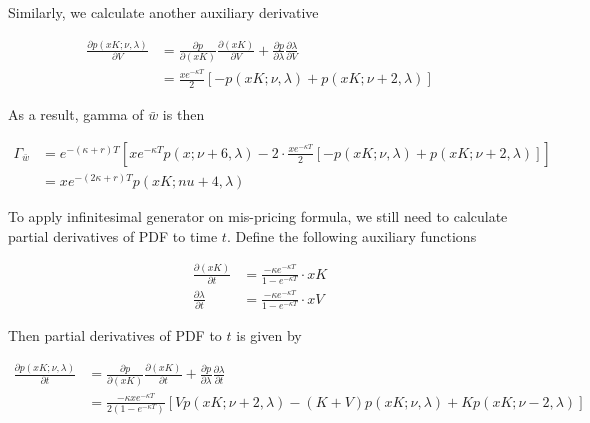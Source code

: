 \noindent Similarly, we calculate another auxiliary derivative

\begin{equation}
    \begin{aligned}
        \frac{\partial p(xK;\nu,\lambda)}{\partial V} &= \frac{\partial p}{\partial (xK)}\frac{\partial (xK)}{\partial V} + \frac{\partial p}{\partial \lambda} \frac{\partial \lambda}{\partial V} \\
        &= \frac{x e^{-\kappa T}}{2} [-p(xK ; \nu, \lambda)+p(xK ; \nu+2, \lambda)]
    \end{aligned}
\end{equation}

\noindent As a result, gamma of $\bar{w}$ is then

\begin{equation}
    \begin{aligned}
        \Gamma_{\bar{w}}&= e^{ -(\kappa+r) T} \left[x e^{-\kappa T} p(x ; \nu+6, \lambda)-2 \cdot \frac{x e^{-\kappa T}}{2} [-p(xK ; \nu, \lambda)+p(xK ; \nu+2, \lambda)]\right] \\
        &= xe^{ -(2\kappa+r) T}p(xK;nu+4,\lambda)
    \end{aligned}
\end{equation}

To apply infinitesimal generator on mis-pricing formula, we still need to calculate partial derivatives of PDF to time $t$. Define the following auxiliary functions

\begin{equation}
    \begin{aligned}
        \frac{\partial (x K)}{\partial t}&= \frac{-\kappa e^{-\kappa T}}{1 - e^{-\kappa T}} \cdot  xK\\
        \frac{\partial \lambda}{\partial t}& =\frac{-\kappa e^{-\kappa T}}{1 - e^{-\kappa T}} \cdot  xV
    \end{aligned}
\end{equation}

\noindent Then partial derivatives of PDF to $t$ is given by

\begin{equation}
    \begin{aligned}
        \frac{\partial p(xK; \nu, \lambda)}{\partial t}&= \frac{\partial p}{\partial (xK)}\frac{\partial (xK)}{\partial t} + \frac{\partial p}{\partial \lambda} \frac{\partial \lambda}{\partial t} \\
        &= \frac{-\kappa x e^{-\kappa T}}{2(1 - e^{-\kappa T})} \left[Vp(xK ; \nu+2, \lambda) - (K+V) p(xK ; \nu, \lambda) + K p(xK ; \nu-2, \lambda)\right]\\
    \end{aligned}
\end{equation}

